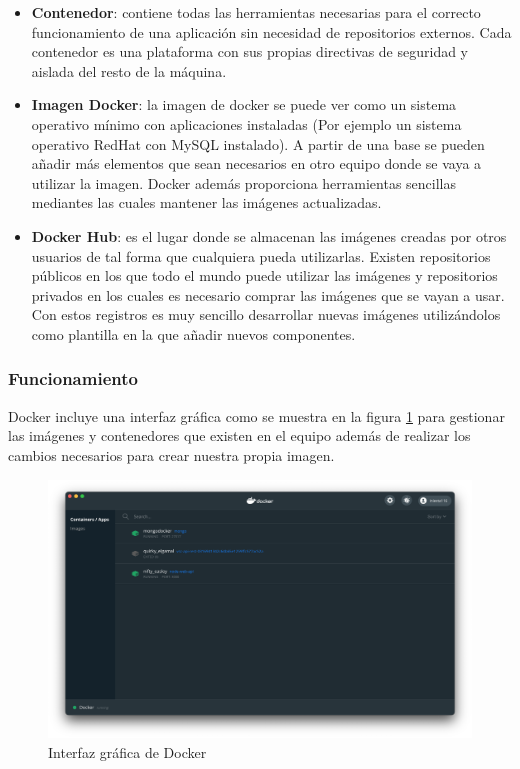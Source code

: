 \begin{itemize}
    \item \textbf{Contenedor}: contiene todas las herramientas necesarias para el correcto funcionamiento de una aplicación sin necesidad de repositorios externos. Cada contenedor es una plataforma con sus propias directivas de seguridad y aislada del resto de la máquina.
    \item \textbf{Imagen Docker}: la imagen de docker se puede ver como un sistema operativo mínimo con aplicaciones instaladas (Por ejemplo un sistema operativo RedHat con MySQL instalado). A partir de una base se pueden añadir más elementos que sean necesarios en otro equipo donde se vaya a utilizar la imagen. Docker además proporciona herramientas sencillas mediantes las cuales mantener las imágenes actualizadas.
    \item \textbf{Docker Hub}: es el lugar donde se almacenan las imágenes creadas por otros usuarios de tal forma que cualquiera pueda utilizarlas. Existen repositorios públicos en los que todo el mundo puede utilizar las imágenes y repositorios privados en los cuales es necesario comprar las imágenes que se vayan a usar. Con estos registros es muy sencillo desarrollar nuevas imágenes utilizándolos como plantilla en la que añadir nuevos componentes.
\end{itemize}

\subsubsection{Funcionamiento}

Docker incluye una interfaz gráfica como se muestra en la figura \ref{fig:dockerUI} para gestionar las imágenes y contenedores que existen en el equipo además de realizar los cambios necesarios para crear nuestra propia imagen.

\begin{figure}[H]
    \centering
    \includegraphics[scale=0.3]{include/capturas/DockerUI.png}
    \caption{Interfaz gráfica de Docker}
    \label{fig:dockerUI}
\end{figure}

